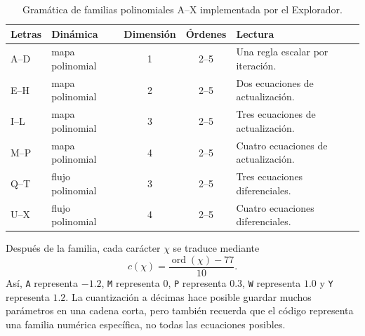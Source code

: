 \documentclass[11pt]{article}
\newcommand{\codigo}[1]{\texttt{#1}}
\begin{document}
\begin{table}[H]
\centering
\caption{Gramática de familias polinomiales A--X implementada por el Explorador.}
\small
\begin{tabularx}{\textwidth}{>{\ttfamily}l>{\raggedright\arraybackslash}p{}CCY}
\toprule
{}
\color{white}\sffamily Letras & \color{white}\sffamily Dinámica &
\color{white}\sffamily Dimensión & \color{white}\sffamily Órdenes &
\color{white}\sffamily Lectura\\
\midrule
A--D & mapa polinomial & 1 & 2--5 & Una regla escalar por iteración.\\
E--H & mapa polinomial & 2 & 2--5 & Dos ecuaciones de actualización.\\
I--L & mapa polinomial & 3 & 2--5 & Tres ecuaciones de actualización.\\
M--P & mapa polinomial & 4 & 2--5 & Cuatro ecuaciones de actualización.\\
Q--T & flujo polinomial & 3 & 2--5 & Tres ecuaciones diferenciales.\\
U--X & flujo polinomial & 4 & 2--5 & Cuatro ecuaciones diferenciales.\\
\bottomrule
\end{tabularx}
\end{table}

Después de la familia, cada carácter \(\chi\) se traduce mediante
\[
 c(\chi)=\frac{\operatorname{ord}(\chi)-77}{10}.
\]
Así, \codigo{A} representa \(-1.2\), \codigo{M} representa \(0\), \codigo{P}
representa \(0.3\), \codigo{W} representa \(1.0\) y \codigo{Y} representa \(1.2\).
La cuantización a décimas hace posible guardar muchos parámetros en una cadena corta,
pero también recuerda que el código representa una familia numérica específica, no
todas las ecuaciones posibles.
\end{document}
